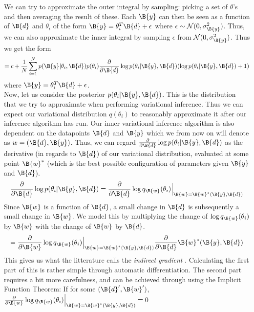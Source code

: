  We can try to approximate the outer integral by sampling: picking a set of $\theta$'s and then averaging the result of these.
Each $\B{y}$ can then be seen as a function of $\B{d}$ and $\theta_i$ of the form $\B{y}=\theta_i^T\B{d} + \epsilon$ where $\epsilon \sim \mathcal{N}(0, \sigma^2_\B{y})$.
Thus, we can also approximate the inner integral by sampling $\epsilon$ from $\mathcal{N}(0, \sigma^2_\B{y})$. Thus we get the form
$$= c + \frac{1}{N}\sum_{i=1}^Np(\B{y}|\theta_i, \B{d})p(\theta_i)\frac{\partial }{\partial \B{d}}\log p(\theta_i |\B{y}, \B{d})(\log p(\theta_i |\B{y}, \B{d}) + 1)
$$
where $\B{y}=\theta_i^T\B{d} + \epsilon$.\\
Now, let us consider the posterior $p(\theta_i|\B{y}, \B{d})$. This is the distribution that we try to approximate when performing variational inference. 
Thus we can expect our variational distribution $q(\theta_i)$ to reasonably approximate it after our inference algorithm has run.
Our inner variational inference algorithm is also dependent on the datapoints $\B{d}$ and $\B{y}$ which we from now on will denote as $w=(\B{d}, \B{y})$.
Thus, we can regard $\frac{\partial }{\partial \B{d}}\log p(\theta_i|\B{y}, \B{d})$ as
the derivative (in regards to $\B{d}$) of our variational distribution, evaluated at some point $\B{w}^*$ (which is the best possible configuration of parameters given $\B{y}$ and $\B{d}$).\\
$$\frac{\partial }{\partial \B{d}}\log p(\theta_i|\B{y}, \B{d}) = \frac{\partial }{\partial \B{d}}\log q_\B{w}(\theta_i)\Bigr\rvert_{\B{w} = \B{w}^*(\B{y}, \B{d})}$$
Since $\B{w}$ is a function of $\B{d}$, a small change in $\B{d}$ is subsequently a small change in $\B{w}$. 
We model this by multiplying the change of $\log q_\B{w}(\theta_i)$ by $\B{w}$ with the change of $\B{w}$ by $\B{d}$.
$$=\frac{\partial}{\partial \B{w}}\log q_\B{w}(\theta_i)\Bigr\rvert_{\B{w} = \B{w}^*(\B{y}, \B{d})}\frac{\partial}{\partial \B{d}}\B{w}^*(\B{y},\B{d})$$
This gives us what the litterature calls the \textit{indirect gradient} .
Calculating the first part of this is rather simple through automatic differentiation.
The second part requires a bit more carefulness, and can be achieved through using the Implicit Function Theorem:
If for some $(\B{d}', \B{w}')$, $\frac{\partial }{\partial \B{w}}\log q_\B{w} (\theta_i)\Bigr\rvert_{\B{w} = \B{w}^*(\B{y}, \B{d})} = 0$
